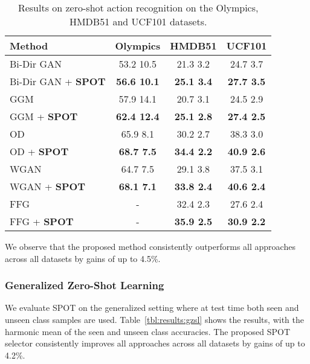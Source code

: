 \documentclass[10pt,twocolumn,letterpaper]{article}
\begin{document}
\setlength{\tabcolsep}{2pt}
\begin{table}[t]
\small
\begin{center}
\begin{tabular}{|l|c|c|c|}
\hline
Method & Olympics & HMDB51 & UCF101\\
\hline\hline
Bi-Dir GAN \cite{syn} & 53.2  10.5 & 21.3  3.2 &	24.7  3.7\\
Bi-Dir GAN \cite{syn} + \textbf{SPOT} & \textbf{56.6  10.1} & \textbf{25.1  3.4} &	\textbf{27.7  3.5}\\
\hline

GGM \cite{GGM2018} & 57.9  14.1 & 20.7  3.1 & 24.5  2.9 \\
GGM \cite{GGM2018} + \textbf{SPOT} & \textbf{62.4  12.4} & \textbf{25.1  2.8} & \textbf{27.4  2.5} \\
\hline
OD \cite{OD} & 65.9  8.1 & 30.2  2.7 & 38.3  3.0\\
OD \cite{OD} + \textbf{SPOT} & \textbf{68.7  7.5} & \textbf{34.4  2.2} & \textbf{40.9  2.6}\\
\hline
WGAN \cite{clswgan} & 64.7  7.5 & 29.1  3.8 & 37.5  3.1 \\
WGAN \cite{clswgan} + \textbf{SPOT} & \textbf{68.1  7.1} & \textbf{33.8  2.4} & \textbf{40.6  2.4} \\
\hline

FFG \cite{finegrain} & - & 32.4  2.3 & 27.6  2.4 \\
FFG \cite{finegrain} + \textbf{SPOT} & - & \textbf{35.9  2.5} & \textbf{30.9  2.2} \\
\hline
\end{tabular}
\end{center}
\caption{Results on zero-shot action recognition on the Olympics, HMDB51 and UCF101 datasets. }
\label{tbl:results:zsl}
\end{table}

We observe that the proposed method consistently outperforms all approaches across all datasets by gains of up to 4.5\%.



\subsubsection{Generalized Zero-Shot Learning}

We evaluate SPOT on the generalized setting where at test time both seen and unseen class samples are used. Table~\ref{tbl:results:gzsl} shows the results, with the harmonic mean of the seen and unseen class accuracies. The proposed SPOT selector consistently improves all approaches across all datasets by gains of up to 4.2\%. 
\end{document}
